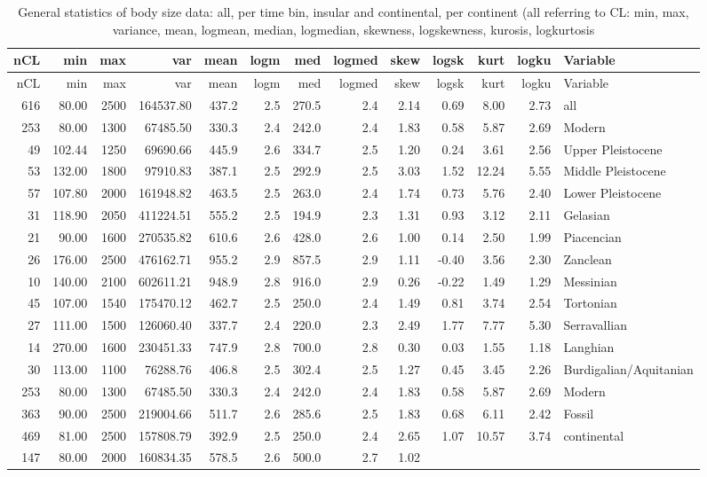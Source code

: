 \begin{landscape}
\begin{longtable}[]{@{}rrrrrrrrrrrrl@{}}
	\caption[General statistics]{General statistics of body size data: all, per time bin,
		insular and continental, per continent (all referring to CL: min, max,
		variance, mean, logmean, median, logmedian, skewness, logskewness,
		kurosis, logkurtosis}
	\label{tab:stats}\tabularnewline
	\toprule
	nCL & min & max & var & mean & logm & med & logmed & skew & logsk & kurt
	& logku & Variable\tabularnewline
	\midrule
	\endfirsthead
	\toprule
	nCL & min & max & var & mean & logm & med & logmed & skew & logsk & kurt
	& logku & Variable\tabularnewline
	\midrule
	\endhead
	616 & 80.00 & 2500 & 164537.80 & 437.2 & 2.5 & 270.5 & 2.4 & 2.14 & 0.69
	& 8.00 & 2.73 & all\tabularnewline
	253 & 80.00 & 1300 & 67485.50 & 330.3 & 2.4 & 242.0 & 2.4 & 1.83 & 0.58
	& 5.87 & 2.69 & Modern\tabularnewline
	49 & 102.44 & 1250 & 69690.66 & 445.9 & 2.6 & 334.7 & 2.5 & 1.20 & 0.24
	& 3.61 & 2.56 & Upper Pleistocene\tabularnewline
	53 & 132.00 & 1800 & 97910.83 & 387.1 & 2.5 & 292.9 & 2.5 & 3.03 & 1.52
	& 12.24 & 5.55 & Middle Pleistocene\tabularnewline
	57 & 107.80 & 2000 & 161948.82 & 463.5 & 2.5 & 263.0 & 2.4 & 1.74 & 0.73
	& 5.76 & 2.40 & Lower Pleistocene\tabularnewline
	31 & 118.90 & 2050 & 411224.51 & 555.2 & 2.5 & 194.9 & 2.3 & 1.31 & 0.93
	& 3.12 & 2.11 & Gelasian\tabularnewline
	21 & 90.00 & 1600 & 270535.82 & 610.6 & 2.6 & 428.0 & 2.6 & 1.00 & 0.14
	& 2.50 & 1.99 & Piacencian\tabularnewline
	26 & 176.00 & 2500 & 476162.71 & 955.2 & 2.9 & 857.5 & 2.9 & 1.11 &
	-0.40 & 3.56 & 2.30 & Zanclean\tabularnewline
	10 & 140.00 & 2100 & 602611.21 & 948.9 & 2.8 & 916.0 & 2.9 & 0.26 &
	-0.22 & 1.49 & 1.29 & Messinian\tabularnewline
	45 & 107.00 & 1540 & 175470.12 & 462.7 & 2.5 & 250.0 & 2.4 & 1.49 & 0.81
	& 3.74 & 2.54 & Tortonian\tabularnewline
	27 & 111.00 & 1500 & 126060.40 & 337.7 & 2.4 & 220.0 & 2.3 & 2.49 & 1.77
	& 7.77 & 5.30 & Serravallian\tabularnewline
	14 & 270.00 & 1600 & 230451.33 & 747.9 & 2.8 & 700.0 & 2.8 & 0.30 & 0.03
	& 1.55 & 1.18 & Langhian\tabularnewline
	30 & 113.00 & 1100 & 76288.76 & 406.8 & 2.5 & 302.4 & 2.5 & 1.27 & 0.45
	& 3.45 & 2.26 & Burdigalian/Aquitanian\tabularnewline
	253 & 80.00 & 1300 & 67485.50 & 330.3 & 2.4 & 242.0 & 2.4 & 1.83 & 0.58
	& 5.87 & 2.69 & Modern\tabularnewline
	363 & 90.00 & 2500 & 219004.66 & 511.7 & 2.6 & 285.6 & 2.5 & 1.83 & 0.68
	& 6.11 & 2.42 & Fossil\tabularnewline
	469 & 81.00 & 2500 & 157808.79 & 392.9 & 2.5 & 250.0 & 2.4 & 2.65 & 1.07
	& 10.57 & 3.74 & continental\tabularnewline
	147 & 80.00 & 2000 & 160834.35 & 578.5 & 2.6 & 500.0 & 2.7 & 1.02 &

\end{longtable}
\end{landscape}
